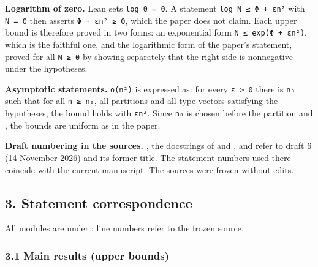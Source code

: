 \documentclass[english,11pt,a4paper]{article}
\begin{document}
\textbf{Logarithm of zero.} Lean sets \texttt{log\ 0\ =\ 0}. A statement \texttt{log\ N\ ≤\ Φ\ +\ εn²} with \texttt{N\ =\ 0} then asserts \texttt{Φ\ +\ εn²\ ≥\ 0}, which the paper does not claim. Each upper bound is therefore proved in two forms: an exponential form \texttt{N\ ≤\ exp(Φ\ +\ εn²)}, which is the faithful one, and the logarithmic form of the paper's statement, proved for all \texttt{N\ ≥\ 0} by showing separately that the right side is nonnegative under the hypotheses.

\textbf{Asymptotic statements.} \texttt{o(n²)} is expressed as: for every \texttt{ε\ \textgreater{}\ 0} there is \texttt{n₀} such that for all \texttt{n\ ≥\ n₀}, all partitions and all type vectors satisfying the hypotheses, the bound holds with \texttt{εn²}. Since \texttt{n₀} is chosen before the partition and , the bounds are uniform as in the paper.

\textbf{Draft numbering in the sources.} , the docstrings of  and , and  refer to draft 6 (14 November 2026) and its former title. The statement numbers used there coincide with the current manuscript. The sources were frozen without edits.

\subsection{3. Statement correspondence}\label{statement-correspondence}

All modules are under ; line numbers refer to the frozen source.

\subsubsection{3.1 Main results (upper bounds)}\label{main-results-upper-bounds}
\end{document}
